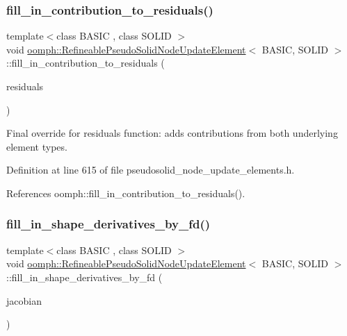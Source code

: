 \subsubsection{\texorpdfstring{fill\+\_\+in\+\_\+contribution\+\_\+to\+\_\+residuals()}{fill\_in\_contribution\_to\_residuals()}}
{\footnotesize\ttfamily template$<$class B\+A\+S\+IC , class S\+O\+L\+ID $>$ \\
void \hyperlink{classoomph_1_1RefineablePseudoSolidNodeUpdateElement}{oomph\+::\+Refineable\+Pseudo\+Solid\+Node\+Update\+Element}$<$ B\+A\+S\+IC, S\+O\+L\+ID $>$\+::fill\+\_\+in\+\_\+contribution\+\_\+to\+\_\+residuals (\begin{DoxyParamCaption}\item[{\hyperlink{classoomph_1_1Vector}{Vector}$<$ double $>$ \&}]{residuals }\end{DoxyParamCaption})\hspace{0.3cm}{\ttfamily [inline]}}



Final override for residuals function\+: adds contributions from both underlying element types. 



Definition at line 615 of file pseudosolid\+\_\+node\+\_\+update\+\_\+elements.\+h.



References oomph\+::fill\+\_\+in\+\_\+contribution\+\_\+to\+\_\+residuals().

\mbox{\label{classoomph_1_1RefineablePseudoSolidNodeUpdateElement_ac7a9338e59678df2d5e9fcf838bd95d1}} 
\subsubsection{\texorpdfstring{fill\+\_\+in\+\_\+shape\+\_\+derivatives\+\_\+by\+\_\+fd()}{fill\_in\_shape\_derivatives\_by\_fd()}}
{\footnotesize\ttfamily template$<$class B\+A\+S\+IC , class S\+O\+L\+ID $>$ \\
void \hyperlink{classoomph_1_1RefineablePseudoSolidNodeUpdateElement}{oomph\+::\+Refineable\+Pseudo\+Solid\+Node\+Update\+Element}$<$ B\+A\+S\+IC, S\+O\+L\+ID $>$\+::fill\+\_\+in\+\_\+shape\+\_\+derivatives\+\_\+by\+\_\+fd (\begin{DoxyParamCaption}\item[{\hyperlink{classoomph_1_1DenseMatrix}{Dense\+Matrix}$<$ double $>$ \&}]{jacobian }\end{DoxyParamCaption})\hspace{0.3cm}{\ttfamily [inline]}}



